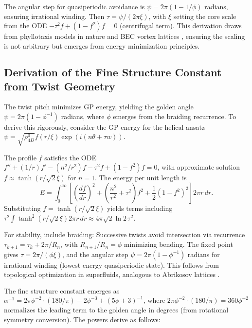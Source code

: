 \documentclass{article}
\begin{document}
The angular step for quasiperiodic avoidance is $\psi = 2\pi (1 - 1/\phi)$ radians, ensuring irrational winding. Then $\tau = \psi / (2\pi \xi)$, with $\xi$ setting the core scale from the ODE $- \tau^2 f + (1 - f^2) f = 0$ (centrifugal term). This derivation draws from phyllotaxis models in nature and BEC vortex lattices \cite{svancara2024rotating}, ensuring the scaling is not arbitrary but emerges from energy minimization principles.

\subsection{Derivation of the Fine Structure Constant from Twist Geometry}

The twist pitch minimizes GP energy, yielding the golden angle $\psi = 2\pi (1 - \phi^{-1})$ radians, where $\phi$ emerges from the braiding recurrence. To derive this rigorously, consider the GP energy for the helical ansatz $\psi = \sqrt{\rho_{4D}^0} f(r/\xi) \exp(i (n \theta + \tau w))$.

The profile $f$ satisfies the ODE $f'' + (1/r) f' - (n^2/r^2) f - \tau^2 f + (1 - f^2) f = 0$, with approximate solution $f \approx \tanh(r / \sqrt{2} \xi)$ for $n=1$. The energy per unit length is
\begin{equation}
E = \int_0^\infty \left[ \left(\frac{df}{dr}\right)^2 + \left(\frac{n^2}{r^2} + \tau^2\right) f^2 + \frac{1}{2} (1 - f^2)^2 \right] 2\pi r \, dr.
\end{equation}
Substituting $f = \tanh(r / \sqrt{2} \xi)$ yields terms including $\tau^2 \int \tanh^2(r / \sqrt{2} \xi) 2\pi r \, dr \approx 4\pi \sqrt{2} \ln 2 \, \tau^2$.

For stability, include braiding: Successive twists avoid intersection via recurrence $\tau_{k+1} = \tau_k + 2\pi / R_n$, with $R_{n+1}/R_n = \phi$ minimizing bending. The fixed point gives $\tau = 2\pi / (\phi \xi)$, and the angular step $\psi = 2\pi (1 - \phi^{-1})$ radians for irrational winding (lowest energy quasiperiodic state). This follows from topological optimization in superfluids, analogous to Abrikosov lattices \cite{onsager1949}.

The fine structure constant emerges as $\alpha^{-1} = 2\pi \phi^{-2} \cdot (180/\pi) - 2 \phi^{-3} + (5 \phi + 3)^{-1}$, where $2\pi \phi^{-2} \cdot (180/\pi) = 360 \phi^{-2}$ normalizes the leading term to the golden angle in degrees (from rotational symmetry conversion). The powers derive as follows:
\end{document}
